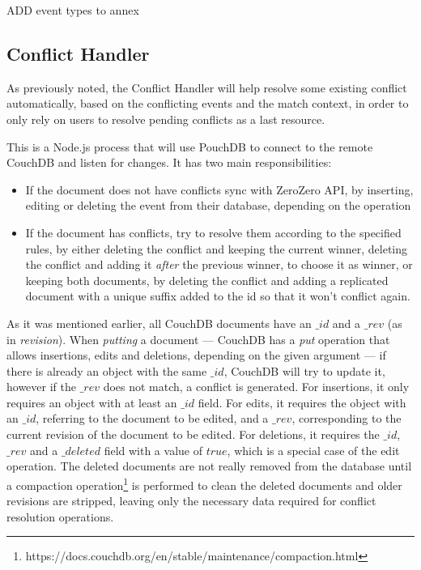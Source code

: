 {\Huge ADD event types to annex}

\subsection{Conflict Handler}

As previously noted, the Conflict Handler will help resolve some existing conflict automatically, based on the conflicting events and the match context, in order to only rely on users to resolve pending conflicts as a last resource.

This is a Node.js process that will use PouchDB to connect to the remote CouchDB and listen for changes. It has two main responsibilities:
\begin{itemize}
    \item If the document does not have conflicts sync with ZeroZero API, by inserting, editing or deleting the event from their database, depending on the operation
    \item If the document has conflicts, try to resolve them according to the specified rules, by either deleting the conflict and keeping the current winner, deleting the conflict and adding it \textit{after} the previous winner, to choose it as winner, or keeping both documents, by deleting the conflict and adding a replicated document with a unique suffix added to the id so that it won't conflict again.
\end{itemize}

As it was mentioned earlier, all CouchDB documents have an $\_id$ and a $\_rev$ (as in \textit{revision}). When \textit{putting} a document --- CouchDB has a \textit{put} operation that allows insertions, edits and deletions, depending on the given argument --- if there is already an object with the same $\_id$, CouchDB will try to update it, however if the $\_rev$ does not match, a conflict is generated. For insertions, it only requires an object with at least an $\_id$ field. For edits, it requires the object with an $\_id$, referring to the document to be edited, and a $\_rev$, corresponding to the current revision of the document to be edited. For deletions, it requires the $\_id$, $\_rev$ and a $\_deleted$ field with a value of $true$, which is a special case of the edit operation. The deleted documents are not really removed from the database until a compaction operation\footnote{https://docs.couchdb.org/en/stable/maintenance/compaction.html} is performed to clean the deleted documents and older revisions are stripped, leaving only the necessary data required for conflict resolution operations.


